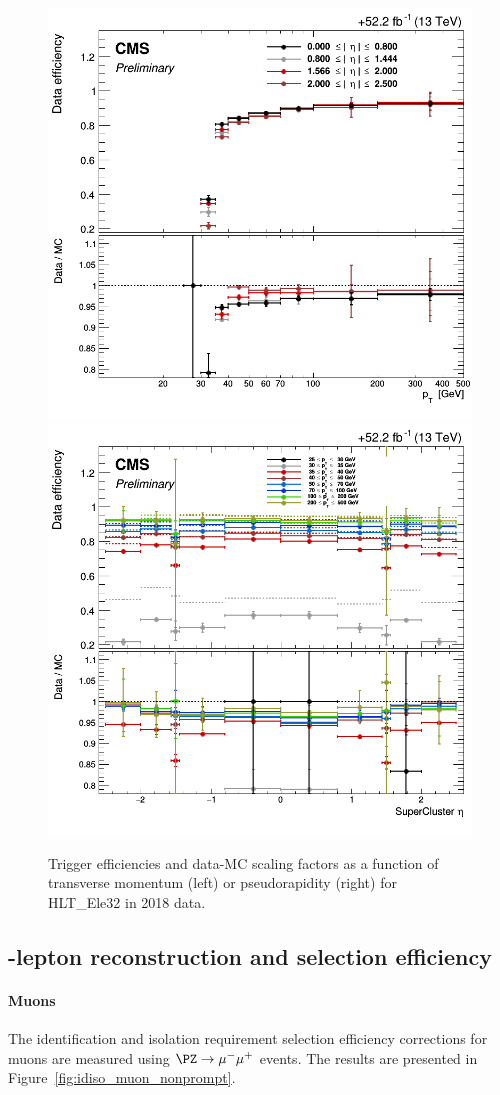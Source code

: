 \begin{figure}[h]
  \centering
  \includegraphics[width=.38\textwidth]{Figures/c6/efficiencies/trigger_electrons/2018/passEle32/leptonSF_SFvspT_passEle32.png}
\hspace{1cm}
  \includegraphics[width=.38\textwidth]{Figures/c6/efficiencies/trigger_electrons/2018/passEle32/leptonSF_SFvseta_passEle32.png}
  \caption{Trigger efficiencies and data-MC scaling factors as a function of transverse momentum (left) or pseudorapidity (right)
    for HLT\_Ele32 in 2018 data. }
  \label{fig:trigger_electrons}
\end{figure}

\subsection{\Displ-lepton reconstruction and selection efficiency} \label{sec:displeptoneff}
\paragraph{Muons}\label{sec:eff_disp_muon}
The identification and isolation requirement selection
efficiency corrections for \displ muons are measured
using $\PZ\to\mu^-\mu^+$ events. The results are presented
in Figure~\ref{fig:idiso_muon_nonprompt}. 

